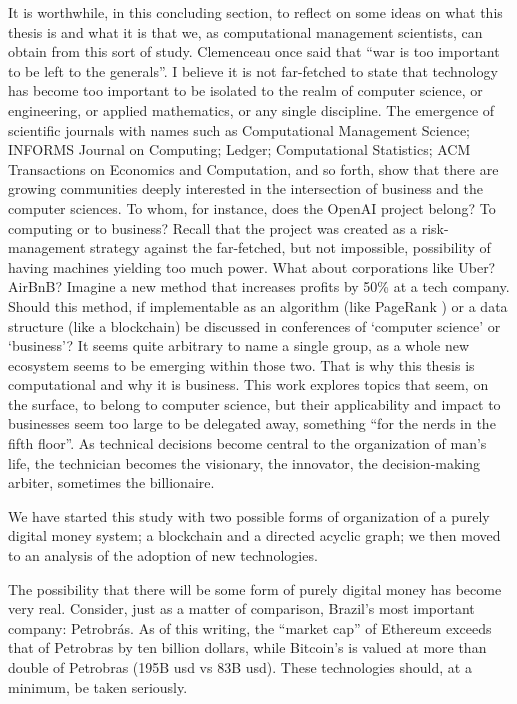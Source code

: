 It is worthwhile, in this concluding section, to reflect on some ideas on what this thesis is and what it is that we, as computational management scientists, can obtain from this sort of study.  Clemenceau once said that ``war is too important to be left to the generals''.  I believe it is not far-fetched to state that technology has become too important to be isolated to the realm of computer science, or engineering, or applied mathematics, or any single discipline.  The emergence of scientific journals with names such as Computational Management Science; INFORMS Journal on Computing; Ledger; Computational Statistics; ACM Transactions on Economics and Computation, and so forth, show that there are growing communities deeply interested in the intersection of business and the computer sciences.  To whom, for instance, does the OpenAI project belong?  To computing or to business?  Recall that the project was created as a risk-management strategy against the far-fetched, but not impossible, possibility of having machines yielding too much power.  What about corporations like Uber?  AirBnB?  Imagine a new method that increases profits by 50\% at a tech company.  Should this method, if implementable as an algorithm (like PageRank \citet{brin1998anatomy}) or a data structure (like a blockchain) be discussed in conferences of `computer science' or `business'? It seems quite arbitrary to name a single group, as a whole new ecosystem seems to be emerging within those two. That is why this thesis is computational and why it is business.  This work explores topics that seem, on the surface, to belong to computer science, but their applicability and impact to businesses seem too large to be delegated away, something ``for the nerds in the fifth floor''.  As technical decisions become central to the organization of man's life, the technician becomes the visionary, the innovator, the decision-making arbiter, sometimes the billionaire.  

We have started this study with two possible forms of organization of a purely digital money system; a blockchain and a directed acyclic graph; we then moved to an analysis of the adoption of new technologies.  

The possibility that there will be some form of purely digital money has become very real.  Consider, just as a matter of comparison, Brazil's most important company: Petrobrás.  As of this writing, the ``market cap'' of Ethereum exceeds that of Petrobras by ten billion dollars, while Bitcoin's is valued at more than double of Petrobras (195B usd vs 83B usd).  These technologies should, at a minimum, be taken seriously. 



